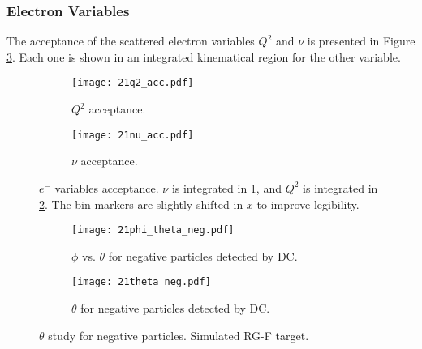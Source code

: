 \subsubsection{Electron Variables}
\label{14.21::electron_variables}
    The acceptance of the scattered electron variables $Q^2$ and $\nu$ is presented in Figure \ref{fig::14.21::electron_acc}.
    Each one is shown in an integrated kinematical region for the other variable.

    \begin{figure}[t!]
        \centering
        \begin{subfigure}[b]{\textwidth}
            \centering
            \texttt{[image: 21q2\_acc.pdf]}
            \caption{$Q^2$ acceptance.}
            \label{fig::14.21::q2_acc}
        \end{subfigure}
        \hfill
        \begin{subfigure}[b]{\textwidth}
            \centering
            \texttt{[image: 21nu\_acc.pdf]}
            \caption{$\nu$ acceptance.}
            \label{fig::14.21::nu_acc}
        \end{subfigure}
        \caption[$e^-$ variables acceptance]
        {$e^-$ variables acceptance.
        $\nu$ is integrated in \ref{fig::14.21::q2_acc}, and $Q^2$ is integrated in \ref{fig::14.21::nu_acc}.
        The bin markers are slightly shifted in $x$ to improve legibility.}
        \label{fig::14.21::electron_acc}
    \end{figure}

    \begin{figure}
        \centering
        \begin{subfigure}[b]{\textwidth}
            \centering
            \texttt{[image: 21phi\_theta\_neg.pdf]}
            \caption[$\phi$ vs. $\theta$ for negative particles]
            {$\phi$ vs. $\theta$ for negative particles detected by DC.}
            \label{fig::14.21::phi_theta_neg}
        \end{subfigure}
        \begin{subfigure}[b]{\textwidth}
            \centering
            \texttt{[image: 21theta\_neg.pdf]}
            \caption[$\theta$ for negative particles]
            {$\theta$ for negative particles detected by DC.}
            \label{fig::14.21::theta_neg}
        \end{subfigure}
        \caption[$\theta$ study for negative particles]
        {$\theta$ study for negative particles.
        Simulated RG-F target.}
        \label{fig::14.21::theta_study_neg}
    \end{figure}

